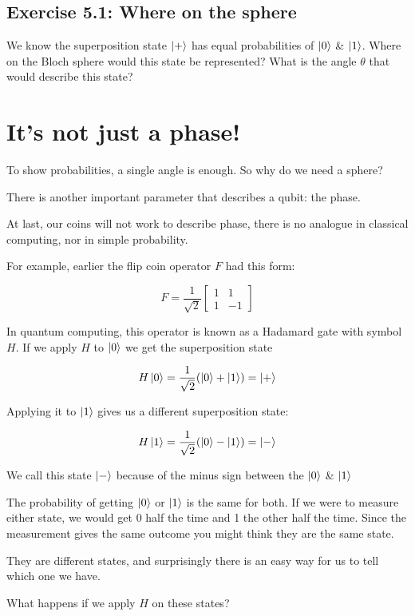 \documentclass{book}
\begin{document}
\subsection{Exercise 5.1: Where on the sphere}

We know the superposition state $\ket{+}$ has equal probabilities of $\ket{0}$ \& $\ket{1}$. Where on the Bloch sphere would this state be represented? What is the angle $\theta$ that would describe this state?



\section{It's not just a phase!} 

To show probabilities, a single angle is enough. So why do we need a sphere? 

There is another important parameter that describes a qubit: the phase. 

At last, our coins will not work to describe phase, there is no analogue in classical computing, nor in simple probability.

For example, earlier the flip coin operator $F$ had this form:

$$
F =  \frac{1}{\sqrt{2}} \begin{bmatrix} 1 & 1 \\ 1 & -1 \end{bmatrix}
$$

In quantum computing, this operator is known as a Hadamard gate with symbol $H$. 
If we apply $H$ to $\ket{0}$ we get the superposition state 

$$
H\ket{0} = \frac{1}{\sqrt{2}} ( \ket{0} + \ket{1}) = \ket{+}
$$

Applying it to $\ket{1}$ gives us a different superposition state: 

$$
H\ket{1} = \frac{1}{\sqrt{2}} ( \ket{0} - \ket{1}) = \ket{-}
$$

We call this state $\ket{-}$ because of the minus sign between the $\ket{0}$ \& $\ket{1}$

The probability of getting $\ket{0}$ or $\ket{1}$ is the same for both. If we were to measure either state, we would get 0 half the time and 1 the other half the time. Since the measurement gives the same outcome you might think they are the same state. 
 
They are different states, and surprisingly there is an easy way for us to tell which one we have. 

What happens if we apply $H$ on these states? 
\end{document}
